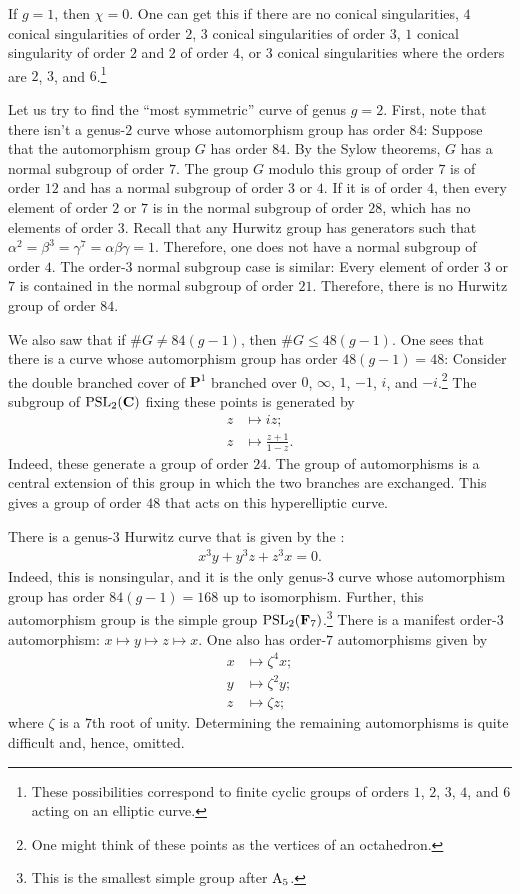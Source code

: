\documentclass [11 pt, oneside, margin = 1 in] {article}
\begin{document}
If $g=1$, then $\chi=0$. One can get this if there are no conical singularities, $4$ conical singularities of order $2$, $3$ conical singularities of order $3$, $1$ conical singularity of order $2$ and $2$ of order $4$, or $3$ conical singularities where the orders are $2$, $3$, and $6$.\footnote{These possibilities correspond to finite cyclic groups of orders $1$, $2$, $3$, $4$, and $6$ acting on an elliptic curve.} 

		Let us try to find the ``most symmetric'' curve of genus $g=2$. First, note that there isn't a genus-$2$ curve whose automorphism group has order $84$: Suppose that the automorphism group $G$ has order $84$. By the Sylow theorems, $G$ has a normal subgroup of order $7$. The group $G$ modulo this group of order $7$ is of order $12$ and has a normal subgroup of order $3$ or $4$. If it is of order $4$, then every element of order $2$ or $7$ is in the normal subgroup of order $28$, which has no elements of order $3$. Recall that any Hurwitz group has generators such that $\alpha^2 = \beta^3 = \gamma^7 = \alpha\beta\gamma = 1$. Therefore, one does not have a normal subgroup of order $4$. The order-$3$ normal subgroup case is similar: Every element of order $3$ or $7$ is contained in the normal subgroup of order $21$. Therefore, there is no Hurwitz group of order $84$.

		We also saw that if $\# G\ne 84(g-1)$, then $\# G \le 48(g-1)$. One sees that there is a curve whose automorphism group has order $48(g-1)=48$: Consider the double branched cover of $\mathbf{P}^1$ branched over $0$, $\infty$, $1$, $-1$, $i$, and $-i$.\footnote{One might think of these points as the vertices of an octahedron.} The subgroup of $\operatorname{PSL}_2(\mathbf{C})$ fixing these points is generated by
		\begin{align*}
			z&\longmapsto iz;\\
			z&\longmapsto \frac{z+1}{1-z}.
		\end{align*}
		Indeed, these generate a group of order $24$. The group of automorphisms is a central extension of this group in which the two branches are exchanged. This gives a group of order $48$ that acts on this hyperelliptic curve.

		There is a genus-$3$ Hurwitz curve that is given by the :
		\begin{align*}
			x^3y + y^3z + z^3x=0.
		\end{align*}
		Indeed, this is nonsingular, and it is the only genus-$3$ curve whose automorphism group has order $84(g-1)=168$ up to isomorphism. Further, this automorphism group is the simple group $\operatorname{PSL}_{2}(\mathbf{F}_{7})$.\footnote{This is the smallest simple group after $\operatorname{A}_5$.} There is a manifest order-$3$ automorphism: $x\longmapsto y\longmapsto z\longmapsto x$. One also has order-$7$ automorphisms given by
		\begin{align*}
			x&\longmapsto \zeta^4x;\\
			y&\longmapsto \zeta^2y;\\
			z&\longmapsto \zeta z;
		\end{align*}
		where $\zeta$ is a $7$th root of unity. Determining the remaining automorphisms is quite difficult and, hence, omitted.
\end{document}
